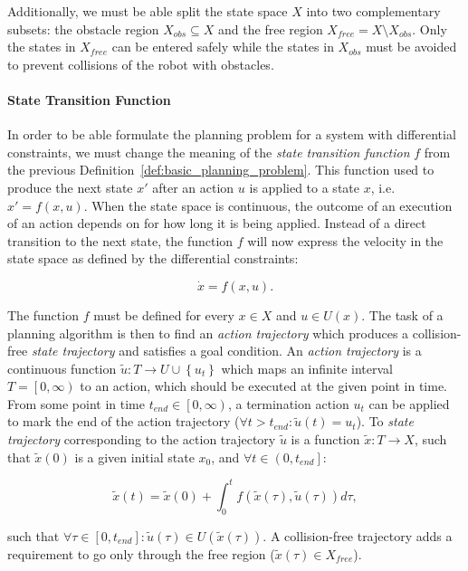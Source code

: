 Additionally, we must be able split the state space $X$ into two complementary subsets: the obstacle region $X_{obs}\subseteq X$ and the free region $X_{free}=X\setminus X_{obs}$. Only the states in $X_{free}$ can be entered safely while the states in $X_{obs}$ must be avoided to prevent collisions of the robot with obstacles.

\paragraph{State Transition Function}

In order to be able formulate the planning problem for a system with differential constraints, we must change the meaning of the \textit{state transition function} $f$ from the previous Definition~\ref{def:basic_planning_problem}. This function used to produce the next state $x'$ after an action $u$ is applied to a state $x$, i.e. $x'=f(x, u)$. When the state space is continuous, the outcome of an execution of an action depends on for how long it is being applied. Instead of a direct transition to the next state, the function $f$ will now express the velocity in the state space as defined by the differential constraints:

\[
	\dot{x}=f(x, u).
\]

The function $f$ must be defined for every $x\in X$ and $u\in U(x)$. The task of a planning algorithm is then to find an \textit{action trajectory} which produces a collision-free \textit{state trajectory} and satisfies a goal condition. An \textit{action trajectory} is a continuous function $\tilde{u}: T \rightarrow U\cup\left\{u_t\right\}$ which maps an infinite interval $T=\left[0, \infty\right)$ to an action, which should be executed at the given point in time. From some point in time $t_{end}\in\left[0, \infty\right)$, a termination action $u_t$ can be applied to mark the end of the action trajectory ($\forall t>t_{end}: \tilde{u}(t)=u_t$). To \textit{state trajectory} corresponding to the action trajectory $\tilde{u}$ is a function $\tilde{x}: T \rightarrow X$, such that $\tilde{x}(0)$ is a given initial state $x_0$, and $\forall t \in \left(0, t_{end}\right]$:

\begin{equation}
	\label{eq:integrate_state_trajectory}
	\tilde{x}(t) = \tilde{x}(0) + \int_0^t f(\tilde{x}(\tau), \tilde{u}(\tau)) d\tau,
\end{equation}

such that $\forall \tau\in\left[0, t_{end}\right]: \tilde{u}(\tau)\in U(\tilde{x}(\tau))$. A collision-free trajectory adds a requirement to go only through the free region ($\tilde{x}(\tau)\in X_{free}$).

